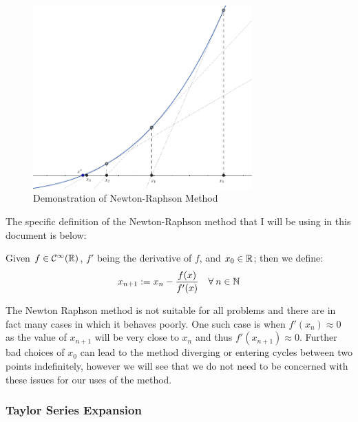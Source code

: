 \begin{figure}[!ht]
	\caption{Demonstration of Newton-Raphson Method}
	\label{FIG_"Newton-Raphson Demonstration"}
	\centering
	\includegraphics[width=0.75\textwidth]{"./Diagrams/Newton-Raphson Diagram"}
\end{figure}

The specific definition of the Newton-Raphson method that I will be using in this document is below:

\begin{Newton Method}
\label{DEF_"Newton-Raphson Method"}
Given \(f \in \mathcal{C^1}(\mathbb{R})\), \(f'\) being the derivative of \(f\), and \(x_0 \in \mathbb{R}\); then we define:
\begin{displaymath}
	x_{n+1} := x_n - \frac{f(x)}{f'(x)}\quad \forall\: n \in \mathbb{N}
\end{displaymath}
\end{Newton Method}

The Newton Raphson method is not suitable for all problems and there are in fact many cases in which it behaves poorly. One such case is when \(f'(x_n) \approx 0\) as the value of \(x_{n+1}\) will be very close to \(x_n\) and thus \(f'(x_{n+1}) \approx 0\). Further bad choices of \(x_0\) can lead to the method diverging or entering cycles between two points indefinitely, however we will see that we do not need to be concerned with these issues for our uses of the method.\\

\subsubsection{Taylor Series Expansion}
\label{SUBSUB_"Taylor Series"}
\theoremstyle{definition}
\newtheorem{Taylor Series}{Definition}[subsubsection]
\newtheorem{Taylor Polynomial}[Taylor Series]{Definition}

